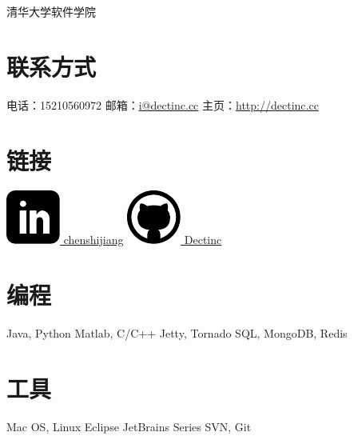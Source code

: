 \documentclass[]{friggeri-cv-cn}
\begin{document}
       {清华大学软件学院}

\begin{aside}
  \section{联系方式}
    电话：15210560972
    邮箱：\href{mailto:i@dectinc.cc}{i@dectinc.cc}
    主页：\href{http://dectinc.cc}{http://dectinc.cc}
  \section{链接}
    \href{http://www.linkedin.com/in/chenshijiang}{\includegraphics[width=.8em]{icons/linkedin.pdf} chenshijiang}
    \href{https://github.com/Dectinc}{\includegraphics[width=.9em]{icons/github.pdf} Dectinc}
  \section{编程}
    Java, Python
    Matlab, C/C++
    Jetty, Tornado
    SQL, MongoDB, Redis
  \section{工具}
    Mac OS, Linux
    Eclipse
    JetBrains Series
    SVN, Git
\end{aside}

\end{document}
